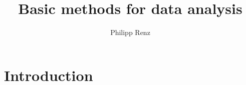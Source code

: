 \documentclass{book}
\title{Basic methods for data analysis}
\author{Philipp Renz}
\begin{document}
\frontmatter
\maketitle
\tableofcontents

\mainmatter
\chapter{Introduction}




\end{document}
